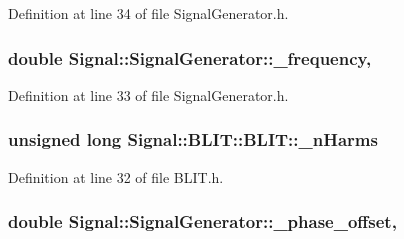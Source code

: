 Definition at line 34 of file Signal\+Generator.\+h.

\hypertarget{classSignal_1_1SignalGenerator_a7f107461333bce68c5dad412db96a8c2}{
\subsubsection[{\+\_\+frequency}]{\setlength{\rightskip}{0pt plus 5cm}double Signal\+::\+Signal\+Generator\+::\+\_\+frequency\hspace{0.3cm}{\ttfamily [protected]}, {\ttfamily [inherited]}}}\label{classSignal_1_1SignalGenerator_a7f107461333bce68c5dad412db96a8c2}


Definition at line 33 of file Signal\+Generator.\+h.

\hypertarget{classSignal_1_1BLIT_1_1BLIT_a0bfbf4e7515a42fab7df748b8497f648}{
\subsubsection[{\+\_\+n\+Harms}]{\setlength{\rightskip}{0pt plus 5cm}unsigned long Signal\+::\+B\+L\+I\+T\+::\+B\+L\+I\+T\+::\+\_\+n\+Harms\hspace{0.3cm}{\ttfamily [protected]}}}\label{classSignal_1_1BLIT_1_1BLIT_a0bfbf4e7515a42fab7df748b8497f648}


Definition at line 32 of file B\+L\+I\+T.\+h.

\hypertarget{classSignal_1_1SignalGenerator_a6b4444d46747c8517171edbbf4b5588f}{
\subsubsection[{\+\_\+phase\+\_\+offset}]{\setlength{\rightskip}{0pt plus 5cm}double Signal\+::\+Signal\+Generator\+::\+\_\+phase\+\_\+offset\hspace{0.3cm}{\ttfamily [protected]}, {\ttfamily [inherited]}}}\label{classSignal_1_1SignalGenerator_a6b4444d46747c8517171edbbf4b5588f}


